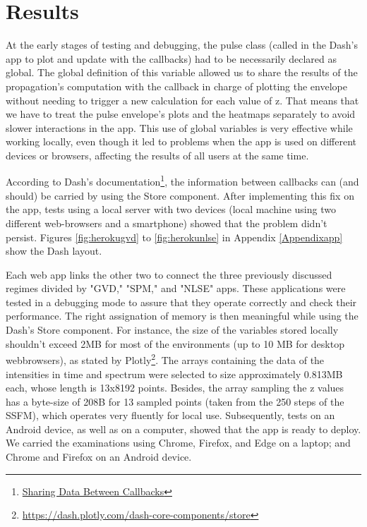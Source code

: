 \chapter{Results}
    At the early stages of testing and debugging, the pulse class (called in the Dash's app to plot and update with the callbacks) had to be necessarily declared as global. The global definition of this variable allowed us to share the results of the propagation's computation with the callback in charge of plotting the envelope without needing to trigger a new calculation for each value of z. That means that we have to treat the pulse envelope's plots and the heatmaps separately to avoid slower interactions in the app. This use of global variables is very effective while working locally, even though it led to problems when the app is used on different devices or browsers, affecting the results of all users at the same time.

According to Dash's documentation\footnote{\href{https://dash.plotly.com/sharing-data-between-callbacks}{Sharing Data Between Callbacks}}, the information between callbacks can (and should) be carried by using the Store component. After implementing this fix on the app, tests using a local server with two devices (local machine using two different web-browsers and a smartphone) showed that the problem didn't persist. Figures \ref{fig:herokugvd} to \ref{fig:herokunlse} in Appendix \ref{Appendixapp} show the Dash layout. 

Each web app links the other two to connect the three previously discussed regimes divided by "GVD," "SPM," and "NLSE" apps. These applications were tested in a debugging mode to assure that they operate correctly and check their performance.  The right assignation of memory is then meaningful while using the Dash's Store component. For instance, the size of the variables stored locally shouldn't exceed 2MB for most of the environments (up to 10 MB for desktop webbrowsers), as stated by Plotly\footnote{\url{https://dash.plotly.com/dash-core-components/store}}. The arrays containing the data of the intensities in time and spectrum were selected to size approximately 0.813MB each, whose length is 13x8192 points. Besides, the array sampling the z values has a byte-size of 208B for 13 sampled points (taken from the 250 steps of the SSFM), which operates very fluently for local use. Subsequently, tests on an Android device, as well as on a computer, showed that the app is ready to deploy. We carried the examinations using Chrome, Firefox, and Edge on a laptop; and Chrome and Firefox on an Android device.

